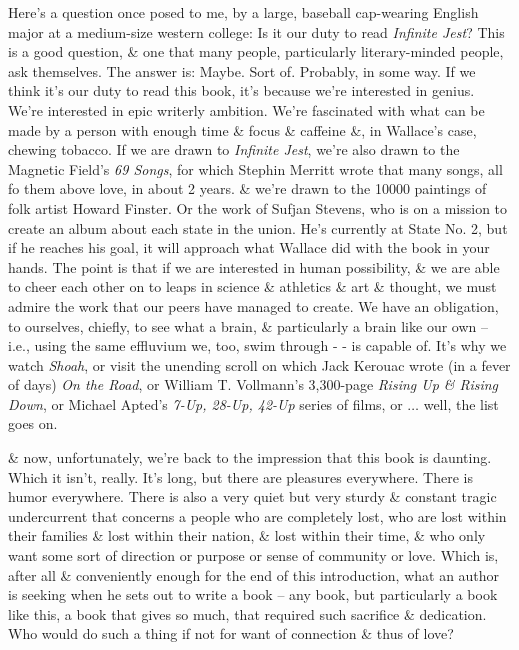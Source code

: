 \documentclass{article}
\numberwithin{equation}{section}
\begin{document}
Here's a question once posed to me, by a large, baseball cap-wearing English major at a medium-size western college: Is it our duty to read \textit{Infinite Jest}? This is a good question, \& one that many people, particularly literary-minded people, ask themselves. The answer is: Maybe. Sort of. Probably, in some way. If we think it's our duty to read this book, it's because we're interested in genius. We're interested in epic writerly ambition. We're fascinated with what can be made by a person with enough time \& focus \& caffeine \&, in Wallace's case, chewing tobacco. If we are drawn to \textit{Infinite Jest}, we're also drawn to the Magnetic Field's \textit{69 Songs}, for which Stephin Merritt wrote that many songs, all fo them above love, in about 2 years. \& we're drawn to the 10000 paintings of folk artist Howard Finster. Or the work of Sufjan Stevens, who is on a mission to create an album about each state in the union. He's currently at State No. 2, but if he reaches his goal, it will approach what Wallace did with the book in your hands. The point is that if we are interested in human possibility, \& we are able to cheer each other on to leaps in science \& athletics \& art \& thought, we must admire the work that our peers have managed to create. We have an obligation, to ourselves, chiefly, to see what a brain, \& particularly a brain like our own -- i.e., using the same effluvium we, too, swim through - - is capable of. It's why we watch \textit{Shoah}, or visit the unending scroll on which Jack Kerouac wrote (in a fever of days) \textit{On the Road}, or William T. Vollmann's 3,300-page \textit{Rising Up \& Rising Down}, or Michael Apted's \textit{7-Up, 28-Up, 42-Up} series of films, or $\ldots$ well, the list goes on.

\& now, unfortunately, we're back to the impression that this book is daunting. Which it isn't, really. It's long, but there are pleasures everywhere. There is humor everywhere. There is also a very quiet but very sturdy \& constant tragic undercurrent that concerns a people who are completely lost, who are lost within their families \& lost within their nation, \& lost within their time, \& who only want some sort of direction or purpose or sense of community or love. Which is, after all \& conveniently enough for the end of this introduction, what an author is seeking when he sets out to write a book -- any book, but particularly a book like this, a book that gives so much, that required such sacrifice \& dedication. Who would do such a thing if not for want of connection \& thus of love?
\end{document}
